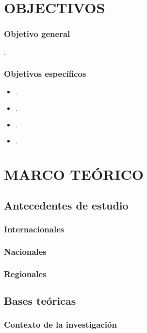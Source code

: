 \documentclass[12pt,a4paper]{article}
\begin{document}
\section{OBJECTIVOS}

\subsubsection{Objetivo general}
\objetivo.
\subsubsection{Objetivos específicos}
\begin{itemize}
	\item \objetivoe.
	\item \objetivoee.
	\item \objetivoeee.
	\item \objetivoeeee.
\end{itemize}


\section{MARCO TEÓRICO}

\subsection{Antecedentes de estudio}
\subsubsection{Internacionales}


\subsubsection{Nacionales}

\subsubsection{Regionales}

\subsection{Bases teóricas}
\subsubsection{Contexto de la investigación}

\subsubsection{\variablei}%
\end{document}
